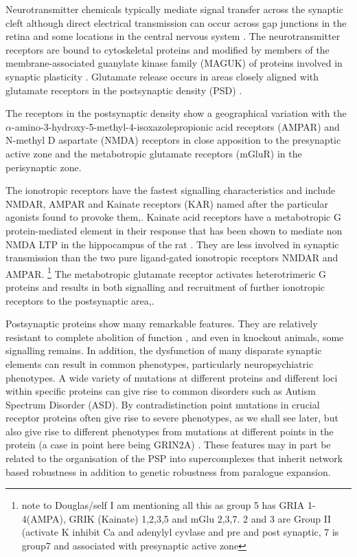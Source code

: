 Neurotransmitter chemicals typically mediate signal transfer across the synaptic cleft although direct electrical transmission can occur across gap junctions in the retina and some locations in the central nervous system \cite{stewart2014structure}. The neurotransmitter receptors are bound to cytoskeletal proteins and modified by members of the membrane-associated guanylate kinase family (MAGUK) of proteins involved in synaptic plasticity \cite{zhu2016mechanistic}. Glutamate release occurs in areas closely aligned with glutamate receptors in the postsynaptic density (PSD) \cite{harris2012ultrastructure}.

 The receptors in the postsynaptic density show a geographical variation with the $\alpha$-amino-3-hydroxy-5-methyl-4-isoxazolepropionic acid  receptors (AMPAR) and N-methyl D aspartate (NMDA) receptors in close apposition to the presynaptic active zone and the metabotropic glutamate receptors (mGluR) in the perisynaptic zone\cite{scheefhals2018functional}.
 
 The ionotropic receptors have the fastest signalling characteristics and include NMDAR, AMPAR  and Kainate receptors (KAR) named after the particular agonists found to provoke them\cite{nakanishi1992molecular},\cite{bettler1995ampa}. Kainate acid receptors have a metabotropic G protein-mediated element in their response that has been shown to mediate non NMDA LTP in the hippocampus of the rat \cite{petrovic2017metabotropic}. They are less involved in synaptic transmission \cite{contractor2011kainate} than the two pure ligand-gated ionotropic receptors NMDAR and AMPAR.
 \footnote{note to Douglas/self I am mentioning all this as group 5 has GRIA 1-4(AMPA), GRIK (Kainate) 1,2,3,5 and mGlu 2,3,7. 2 and 3 are Group II (activate K inhibit Ca and adenylyl cyvlase and pre and post synaptic, 7 is group7 and associated with presynaptic active zone}  
 The metabotropic glutamate receptor activates heterotrimeric G proteins and results in both signalling and recruitment of further ionotropic receptors to the postsynaptic area\cite{niswender2010metabotropic},\cite{pin2016organization}.  
 
Postsynaptic proteins show many remarkable features. They are relatively resistant to complete abolition of function \cite{keverne1997evaluation}, \cite{charlesworth2016canalization} and even in knockout animals, some signalling remains. In addition, the dysfunction of many disparate synaptic elements can result in common phenotypes, particularly neuropsychiatric phenotypes. A wide variety of mutations at different proteins and different loci within specific proteins can give rise to common disorders such as Autism Spectrum Disorder (ASD)\cite{toro2010key}. By contradistinction point mutations in crucial receptor proteins often give rise to severe phenotypes, as we shall see later, but also give rise to different phenotypes from mutations at different points in the protein (a case in point here being GRIN2A) \cite{endele2010mutations}. These features may in part be related to the organisation of the PSP into supercomplexes that inherit network based robustness in addition to genetic robustness from paralogue expansion\cite{grant2016molecular}.

